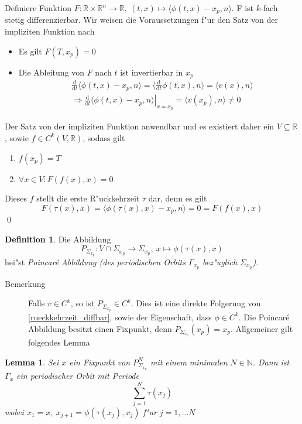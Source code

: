 \documentclass[a4paper, 13pt]{scrreprt}
\newtheorem{lemma}[theorem]{Lemma}
\theoremstyle{definition} \newtheorem{definition}{Definition}[section]
\newenvironment{beweis}[1][Beweis]{\begin{trivlist}
\item[\hskip \labelsep {\bfseries #1}]}{\end{trivlist}}
\newcommand{\RR}{\mathbb{R}}
\begin{document}
\begin{beweis}
Definiere Funktion $F \colon \RR \times \RR^n \to \RR, \ (t, x) \mapsto \langle \phi(t, x) - x_p, n\rangle$. F ist $k$-fach stetig differenzierbar. Wir weisen die Voraussetzungen f"ur den Satz von der impliziten Funktion nach
\begin{itemize}
	\item Es gilt $F(T, x_p) = 0$ 
	\item Die Ableitung von $F$ nach $t$ ist invertierbar in $x_p$
	\begin{align*}
		&\frac{\mathrm d}{\mathrm dt} \langle \phi(t, x) - x_p, n\rangle =  \langle \frac{\mathrm d}{\mathrm dt} \phi(t, x), n\rangle = \langle v(x), n \rangle\\
		&\Rightarrow \left. \frac{\mathrm d}{\mathrm dt} \langle \phi(t, x) - x_p, n\rangle \right|_{x=x_p} = \langle v(x_p), n \rangle \neq 0
	\end{align*}
\end{itemize}
Der Satz von der impliziten Funktion anwendbar und es existiert daher ein $V\subseteq \RR$, sowie $f \in C^k(V, \RR)$, sodass gilt
\begin{enumerate}
	\item $f(x_p) = T$
	\item $\forall x \in V: F(f(x), x) = 0$
\end{enumerate}
Dieses $f$ stellt die erste R"uckkehrzeit $\tau$ dar, denn es gilt
$$ F(\tau(x), x) = \langle \phi(\tau(x), x) - x_p, n\rangle = 0 = F(f(x), x) $$
\qed
\end{beweis}
\begin{definition}
Die Abbildung
$$P_{\Sigma_{x_p}} \colon V \cap \Sigma_{x_p} \to \Sigma_{x_p},\ x\mapsto \phi(\tau(x), x)$$
hei"st \emph{Poincar\'{e} Abbildung (des periodischen Orbits $\Gamma_{x_p}$ bez"uglich $\Sigma_{x_p}$)}. 
\end{definition}
\begin{description}
\item[Bemerkung] Falls $v\in C^k$, so ist $P_{\Sigma_{x_p}} \in C^k$. Dies ist eine direkte Folgerung von \eqref{rueckkehrzeit_diffbar}, sowie der Eigenschaft, dass $\phi \in C^k$. Die Poincar\'{e} Abbildung besitzt einen Fixpunkt, denn ${P_{\Sigma_{x_p}}(x_p) = x_p}$. Allgemeiner gilt folgendes Lemma 
\end{description}

\begin{lemma}
Sei $x$ ein Fixpunkt von $P_{\Sigma_{x_p}}^N$ mit einem minimalen $N \in \mathbb{N}$. Dann ist $\Gamma_x$ ein periodischer Orbit mit Periode
$$ \sum_{j=1}^N{\tau(x_j)}$$
wobei $x_1 = x, \ x_{j+1} = \phi(\tau(x_j), x_{j})$ f"ur $j = 1,\ldots N$ \
\end{lemma}
\end{document}
